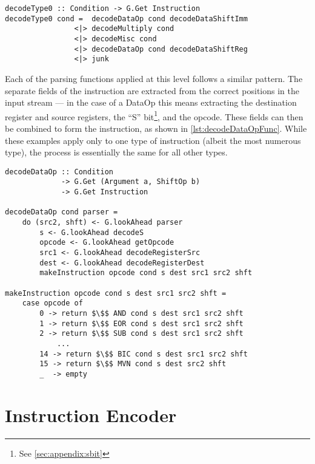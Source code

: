\begin{lstlisting}[mathescape,numbers=none,caption={The $decodeType0$ function},label={lst:decodeType0Func}]
decodeType0 :: Condition -> G.Get Instruction
decodeType0 cond =  decodeDataOp cond decodeDataShiftImm
                <|> decodeMultiply cond
                <|> decodeMisc cond
                <|> decodeDataOp cond decodeDataShiftReg
                <|> junk
\end{lstlisting}

Each of the parsing functions applied at this level follows a similar pattern. The separate fields of the instruction are extracted from the correct positions in the input stream --- in the case of a DataOp this means extracting the destination register and source registers, the ``S'' bit\footnote{See \autoref{sec:appendix:sbit}}, and the opcode. These fields can then be combined to form the instruction, as shown in \autoref{lst:decodeDataOpFunc}. While these examples apply only to one type of instruction (albeit the most numerous type), the process is essentially the same for all other types.

\begin{lstlisting}[mathescape,numbers=none,caption={The decodeDataOp makeInstruction functions},label={lst:decodeDataOpFunc}]
decodeDataOp :: Condition
             -> G.Get (Argument a, ShiftOp b)
             -> G.Get Instruction

decodeDataOp cond parser =
    do (src2, shft) <- G.lookAhead parser
        s <- G.lookAhead decodeS
        opcode <- G.lookAhead getOpcode
        src1 <- G.lookAhead decodeRegisterSrc
        dest <- G.lookAhead decodeRegisterDest
        makeInstruction opcode cond s dest src1 src2 shft

makeInstruction opcode cond s dest src1 src2 shft =
    case opcode of
        0 -> return $\$$ AND cond s dest src1 src2 shft
        1 -> return $\$$ EOR cond s dest src1 src2 shft
        2 -> return $\$$ SUB cond s dest src1 src2 shft
            ...
        14 -> return $\$$ BIC cond s dest src1 src2 shft
        15 -> return $\$$ MVN cond s dest src2 shft
        _  -> empty
\end{lstlisting}


\section{Instruction Encoder}


